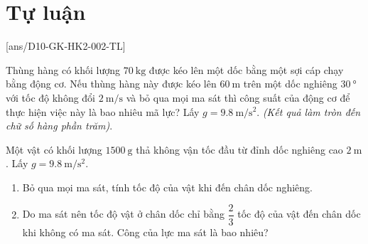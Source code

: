 \section{Tự luận} 
\setcounter{ex}{0}
[ans/D10-GK-HK2-002-TL]
\begin{ex}
	Thùng hàng có khối lượng $\SI{70}{\kilogram}$ được kéo lên một dốc bằng một sợi cáp chạy bằng động cơ. Nếu thùng hàng này được kéo lên $\SI{60}{\meter}$ trên một dốc nghiêng $\SI{30}{\degree}$ với tốc độ không đổi $\SI{2}{\meter/\second}$ và bỏ qua mọi ma sát thì công suất của động cơ để thực hiện việc này là bao nhiêu mã lực? Lấy $g=\SI{9.8}{\meter/\second^2}$. \textit{(Kết quả làm tròn đến chữ số hàng phần trăm)}.
\end{ex}
\begin{ex}
	Một vật có khối lượng $\SI{1500}{\gram}$ thả không vận tốc đầu từ đỉnh dốc nghiêng cao $\SI{2}{\meter}$. Lấy $g=\SI{9.8}{\meter / \second\squared}$.
	\begin{enumerate}[label=\alph*)]
		\item Bỏ qua mọi ma sát, tính tốc độ của vật khi đến chân dốc nghiêng.
		\item Do ma sát nên tốc độ vật ở chân dốc chỉ bằng $\dfrac{2}{3}$ tốc độ của vật đến chân dốc khi không có ma sát. Công của lực ma sát là bao nhiêu?
	\end{enumerate}
\end{ex}

